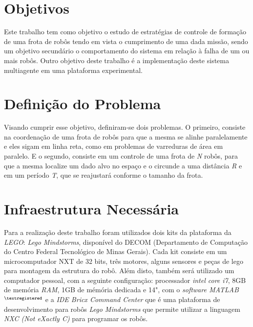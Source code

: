 \section{Objetivos}
\label{sec:objetivos}

Este trabalho tem como objetivo o estudo de estratégias de controle de formação de uma frota de robôs tendo em vista o cumprimento de uma dada missão, sendo um objetivo secundário o comportamento do sistema em relação à falha de um ou mais robôs. Outro objetivo deste trabalho é a implementação deste sistema multiagente em uma plataforma experimental.

\section{Definição do Problema}
\label{sec:defProb}
Visando cumprir esse objetivo, definiram-se dois problemas. O primeiro, consiste na coordenação de uma frota de robôs para que a mesma se alinhe paralelamente e eles sigam em linha reta, como em problemas de varreduras de área em paralelo. E o segundo, consiste em um controle de uma frota de \emph{N} robôs, para que a mesma localize um dado alvo no espaço e o circunde a uma distância \emph{R} e em um período \emph{T}, que se reajustará conforme o tamanho da frota.  

\section{Infraestrutura Necessária}
\label{sec:infra}


Para a realização deste trabalho foram utilizados dois kits da plataforma da \emph{LEGO\textregistered}: \emph{Lego Mindstorms\textregistered}, disponível do DECOM (Departamento de Computação do Centro Federal Tecnológico de Minas Gerais). Cada kit consiste em um microcomputador NXT de 32 bits, três motores, alguns sensores e peças de lego para montagem da estrutura do robô. Além disto, também será utilizado  um computador pessoal, com a seguinte configuração: processador \emph{intel core i7}, 8GB de memória \emph{RAM}, 1GB de mémória dedicada e 14", com o \emph{software MATLAB$^{\textregistered}$} e a \emph{IDE Bricx Command Center} \cite{sorceforge2001} que é uma plataforma de desenvolvimento para robôs \emph{Lego Mindstorms\textregistered} que permite utilizar a linguagem \emph{NXC (Not eXactly C)} para programar os robôs.